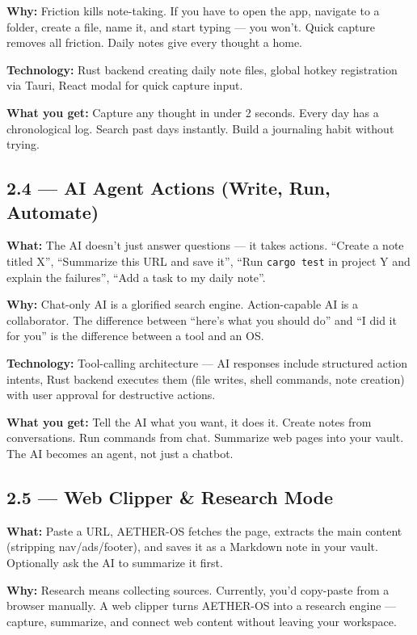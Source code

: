 \documentclass[11pt,a4paper]{article}
\begin{document}
\textbf{Why:} Friction kills note-taking. If you have to open the app, navigate to a folder, create a file, name it, and start typing --- you won't. Quick capture removes all friction. Daily notes give every thought a home.

\textbf{Technology:} Rust backend creating daily note files, global hotkey registration via Tauri, React modal for quick capture input.

\textbf{What you get:} Capture any thought in under 2 seconds. Every day has a chronological log. Search past days instantly. Build a journaling habit without trying.

\subsection{2.4 --- AI Agent Actions (Write, Run, Automate)}

\textbf{What:} The AI doesn't just answer questions --- it takes actions. ``Create a note titled X'', ``Summarize this URL and save it'', ``Run \texttt{cargo test} in project Y and explain the failures'', ``Add a task to my daily note''.

\textbf{Why:} Chat-only AI is a glorified search engine. Action-capable AI is a collaborator. The difference between ``here's what you should do'' and ``I did it for you'' is the difference between a tool and an OS.

\textbf{Technology:} Tool-calling architecture --- AI responses include structured action intents, Rust backend executes them (file writes, shell commands, note creation) with user approval for destructive actions.

\textbf{What you get:} Tell the AI what you want, it does it. Create notes from conversations. Run commands from chat. Summarize web pages into your vault. The AI becomes an agent, not just a chatbot.

\subsection{2.5 --- Web Clipper \& Research Mode}

\textbf{What:} Paste a URL, AETHER-OS fetches the page, extracts the main content (stripping nav/ads/footer), and saves it as a Markdown note in your vault. Optionally ask the AI to summarize it first.

\textbf{Why:} Research means collecting sources. Currently, you'd copy-paste from a browser manually. A web clipper turns AETHER-OS into a research engine --- capture, summarize, and connect web content without leaving your workspace.
\end{document}
